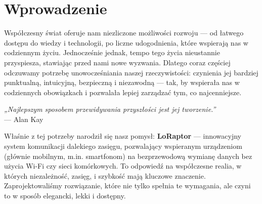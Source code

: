 \section{Wprowadzenie}

Współczesny świat oferuje nam niezliczone możliwości rozwoju --- od łatwego dostępu do wiedzy i technologii,
po liczne udogodnienia, które wspierają nas w codziennym życiu. Jednocześnie jednak, tempo tego życia
nieustannie przyspiesza, stawiając przed nami nowe wyzwania. Dlatego coraz częściej odczuwamy potrzebę
unowocześniania naszej rzeczywistości: czynienia jej bardziej punktualną, intuicyjną,
bezpieczną i niezawodną --- tak, by wspierała nas w codziennych obowiązkach i pozwalała lepiej zarządzać tym,
co najcenniejsze.

\begin{tcolorbox}[
	colback=gray!5!white, 
	colframe=gray!75!black, 
	boxrule=0.8pt, 
	arc=5pt,
	enhanced,
	drop shadow,
	top=8pt,
	bottom=8pt,
	center
]
\centering
\emph{„Najlepszym sposobem przewidywania przyszłości jest jej tworzenie.”} \\
\smallskip
\hfill — Alan Kay
\end{tcolorbox}

Właśnie z tej potrzeby narodził się nasz pomysł: \textbf{LoRaptor} --- innowacyjny system komunikacji dalekiego zasięgu,
pozwalający wspieranym urządzeniom (głównie mobilnym, m.in. smartfonom) na bezprzewodową wymianę danych bez użycia Wi-Fi czy sieci komórkowych.
To odpowiedź na współczesne realia, w których niezależność, zasięg, i szybkość mają kluczowe znaczenie.
Zaprojektowaliśmy rozwiązanie, które nie tylko spełnia te wymagania, ale czyni to w sposób elegancki, lekki i dostępny.